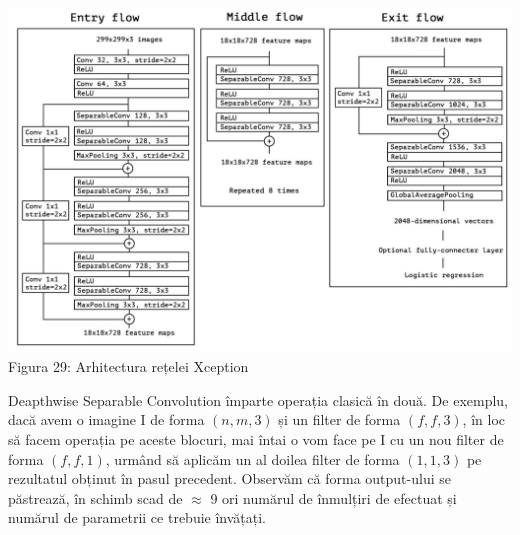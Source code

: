 \begin{center}
\includegraphics[scale=0.3]{xception}
Figura 29: Arhitectura rețelei Xception
\end{center}

Deapthwise Separable Convolution împarte operația clasică în două. De exemplu, dacă avem o imagine I de forma $(n,m,3)$ și un filter de forma $(f,f,3)$, în loc să facem operația pe aceste blocuri, mai întai o vom face pe I cu un nou filter de forma $(f,f,1)$, urmând să aplicăm un al doilea filter de forma $(1,1,3)$ pe rezultatul obținut în pasul precedent. Observăm că forma output-ului se păstrează, în schimb scad de $\approx$ 9 ori numărul de înmulțiri de efectuat și numărul de parametrii ce trebuie învățați.

